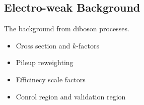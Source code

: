 \subsection{Electro-weak Background}
The background from diboson processes.
\begin{itemize}
  \item Cross section and $k$-factors
  \item Pileup reweighting
  \item Efficinecy scale factors
  \item Conrol region and validation region
\end{itemize}
